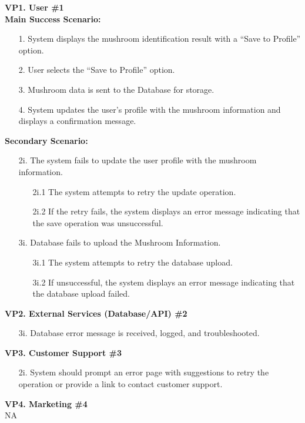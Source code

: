 \documentclass[]{article}
\begin{document}
\begin{enumerate}[{\bf BE1.}]
	    \textbf{VP1. User \#1}\\
	    \textbf{Main Success Scenario:}
	    \begin{enumerate}
	        \item[1.] System displays the mushroom identification result with a ``Save to Profile'' option.
	        \item[2.] User selects the ``Save to Profile'' option.
	        \item[3.] Mushroom data is sent to the Database for storage.
	        \item[4.] System updates the user's profile with the mushroom information and displays a confirmation message.
	    \end{enumerate}
	    \textbf{Secondary Scenario:}
	    {\color{red}
	    \begin{enumerate}
	        \item[2i.] The system fails to update the user profile with the mushroom information.
	        \begin{enumerate}
	            \item[2i.1] The system attempts to retry the update operation.
	            \item[2i.2] If the retry fails, the system displays an error message indicating that the save operation was unsuccessful. 
	        \end{enumerate}
	        \item[3i.] Database fails to upload the Mushroom Information.
	        \begin{enumerate}
	            \item[3i.1] The system attempts to retry the database upload.
	            \item[3i.2] If unsuccessful, the system displays an error message indicating that the database upload failed.
	        \end{enumerate}
	    \end{enumerate}
	    }
	    \textbf{VP2. External Services (Database/API) \#2}
	    {\color{red}
	        \begin{enumerate}
	        \item[3i.] Database error message is received, logged, and troubleshooted.
	    \end{enumerate}
	    }
	    \textbf{VP3. Customer Support \#3}
	        {\color{red}
	        \begin{enumerate}
	        \item[2i.] System should prompt an error page with suggestions to retry the operation or provide a link to contact customer support.\\
	    \end{enumerate}
	    }
	    \textbf{VP4. Marketing \#4}\\
	    NA\\[1mm]
	    

\end{enumerate}
\end{document}
